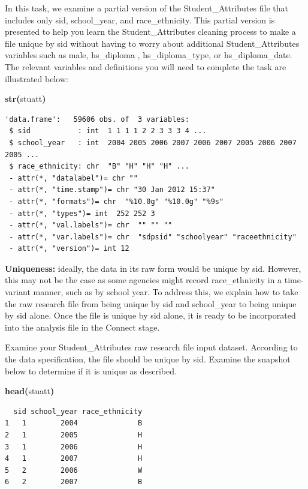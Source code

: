 \documentclass[12pt]{article}
\makeatletter
\newcommand{\hlfunctioncall}[1]{\textcolor[rgb]{0.501960784313725,0,0.329411764705882}{\textbf{#1}}}%
\newcommand{\hlkeyword}[1]{\textcolor[rgb]{0,0,0}{\textbf{#1}}}%
\newcommand{\hlsymbol}[1]{\textcolor[rgb]{0,0,0}{#1}}%
\newenvironment{kframe}{%
 \def\FrameCommand##1{\hskip\@totalleftmargin \hskip-\fboxsep
 \colorbox{shadecolor}{##1}\hskip-\fboxsep
     \hskip-\linewidth \hskip-\@totalleftmargin \hskip\columnwidth}%
 \MakeFramed {\advance\hsize-\width
   \@totalleftmargin\z@ \linewidth\hsize
   \@setminipage}}%
 {\par\unskip\endMakeFramed}
\newenvironment{knitrout}{}{} %
\renewenvironment{knitrout}{\begin{footnotesize}}{\end{footnotesize}}
\makeatother
\begin{document}
In this task, we examine a partial version of the Student\_Attributes file that includes only sid, school\_year, and race\_ethnicity. This partial 
version is presented to help you learn the Student\_Attributes cleaning process to make a file unique by sid without having to 
worry about additional Student\_Attributes variables such as male, hs\_diploma , hs\_diploma\_type, or hs\_diploma\_date.  The 
relevant variables and definitions you will need to complete the task are illustrated below:

\begin{knitrout}
\color{fgcolor}\begin{kframe}
\begin{flushleft}
\ttfamily\noindent
\hlfunctioncall{str}\hlkeyword{(}\hlsymbol{stuatt}\hlkeyword{)}\mbox{}
\normalfont
\end{flushleft}
\begin{verbatim}
'data.frame':	59606 obs. of  3 variables:
 $ sid           : int  1 1 1 1 2 2 3 3 3 4 ...
 $ school_year   : int  2004 2005 2006 2007 2006 2007 2005 2006 2007 2005 ...
 $ race_ethnicity: chr  "B" "H" "H" "H" ...
 - attr(*, "datalabel")= chr ""
 - attr(*, "time.stamp")= chr "30 Jan 2012 15:37"
 - attr(*, "formats")= chr  "%10.0g" "%10.0g" "%9s"
 - attr(*, "types")= int  252 252 3
 - attr(*, "val.labels")= chr  "" "" ""
 - attr(*, "var.labels")= chr  "sdpsid" "schoolyear" "raceethnicity"
 - attr(*, "version")= int 12
\end{verbatim}
\end{kframe}
\end{knitrout}


\textbf{Uniqueness:} ideally, the data in its raw form would be unique by sid.  However, this may not be the case as some agencies might 
record race\_ethnicity in a time-variant manner, such as by school year. To address this, we explain how to take the raw research 
file from being unique by sid and school\_year to being unique by sid alone.  Once the file is unique by sid alone, it is ready to be 
incorporated into the analysis file in the Connect stage.

Examine  your Student\_Attributes raw research file input dataset.  According to the data specification, the file should be 
unique by sid.  Examine the snapshot below to determine if it is unique as described.  

\begin{knitrout}
\color{fgcolor}\begin{kframe}
\begin{flushleft}
\ttfamily\noindent
\hlfunctioncall{head}\hlkeyword{(}\hlsymbol{stuatt}\hlkeyword{)}\mbox{}
\normalfont
\end{flushleft}
\begin{verbatim}
  sid school_year race_ethnicity
1   1        2004              B
2   1        2005              H
3   1        2006              H
4   1        2007              H
5   2        2006              W
6   2        2007              B
\end{verbatim}
\end{kframe}
\end{knitrout}
\end{document}
